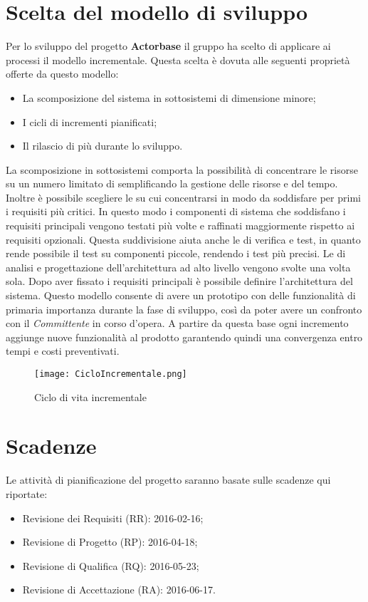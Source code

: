 \documentclass{scalatekids-article}
\begin{document}
\section{Scelta del modello di sviluppo}
Per lo sviluppo del progetto \textbf{Actorbase} il gruppo ha scelto di applicare
ai processi il modello incrementale. Questa scelta è dovuta alle seguenti
proprietà offerte da questo modello:
\begin{itemize}
\item {La scomposizione del sistema in sottosistemi di dimensione minore;}
\item {I cicli di incrementi pianificati;}
\item {Il rilascio di più  durante lo sviluppo.}
\end{itemize}
La scomposizione in sottosistemi comporta la possibilità di concentrare le
risorse su un numero limitato di  semplificando la gestione delle
risorse e del tempo. Inoltre è possibile scegliere le  su cui
concentrarsi in modo da soddisfare per primi i requisiti più critici. In questo
modo i componenti di sistema che soddisfano i requisiti principali vengono testati più
volte e raffinati maggiormente rispetto ai requisiti opzionali. Questa
suddivisione aiuta anche le  di verifica e test, in quanto rende possibile
il test su componenti piccole, rendendo i test più precisi. Le  di
analisi e progettazione dell'architettura ad alto livello vengono svolte una
volta sola. Dopo aver fissato i requisiti principali è possibile definire
l'architettura del sistema. Questo modello consente di avere un prototipo con
delle funzionalità di primaria importanza durante la fase di sviluppo, così da
poter avere un confronto con il \textit{Committente} in corso d'opera. A partire da
questa base ogni incremento aggiunge nuove funzionalità al prodotto garantendo
quindi una convergenza entro tempi e costi preventivati.
\begin{figure}[H]
  \begin{center}
    \texttt{[image: CicloIncrementale.png]}
    \caption{Ciclo di vita incrementale}
  \end{center}
\end{figure}
\section{Scadenze}
Le attività di pianificazione del progetto saranno basate sulle scadenze qui riportate:
\begin{itemize}
\item {Revisione dei Requisiti (RR): 2016-02-16;}
\item {Revisione di Progetto (RP): 2016-04-18;}
\item {Revisione di Qualifica (RQ): 2016-05-23;}
\item {Revisione di Accettazione (RA): 2016-06-17.}
\end{itemize}
\end{document}
